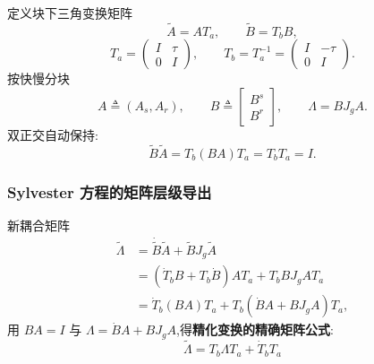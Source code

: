 \documentclass[11pt,a4paper]{article}
\newcommand{\Jg}{J_{\!g}}
\begin{document}
定义块下三角变换矩阵
\begin{equation}
\widetilde A=AT_a,\qquad \widetilde B=T_bB,
\end{equation}
\begin{equation}
T_a=\begin{pmatrix}I & \tau\\ 0 & I\end{pmatrix},\qquad T_b=T_a^{-1}=\begin{pmatrix}I & -\tau\\ 0 & I\end{pmatrix}.
\end{equation}
按快慢分块
\begin{equation}
A\triangleq(A_s,A_r),\qquad B\triangleq\begin{bmatrix}B^s\\ B^r\end{bmatrix},\qquad \Lambda=B\Jg A.
\end{equation}
双正交自动保持:
\begin{equation}
\widetilde B\widetilde A=T_b(BA)T_a=T_bT_a=I.
\end{equation}

\subsubsection*{Sylvester 方程的矩阵层级导出}

新耦合矩阵
\begin{align}
\widetilde\Lambda&=\dot{\widetilde B}\widetilde A+\widetilde B\Jg\widetilde A\nonumber\\
&=(\dot T_bB+T_b\dot B)AT_a+T_bB\Jg AT_a\nonumber\\
&=\dot T_b(BA)T_a+T_b(\dot BA+B\Jg A)T_a,
\end{align}
用 $BA=I$ 与 $\Lambda=\dot BA+B\Jg A$,得\textbf{精化变换的精确矩阵公式}:
\begin{equation}
\boxed{\;\widetilde\Lambda=T_b\Lambda T_a+\dot T_bT_a\;}
\end{equation}
\end{document}
